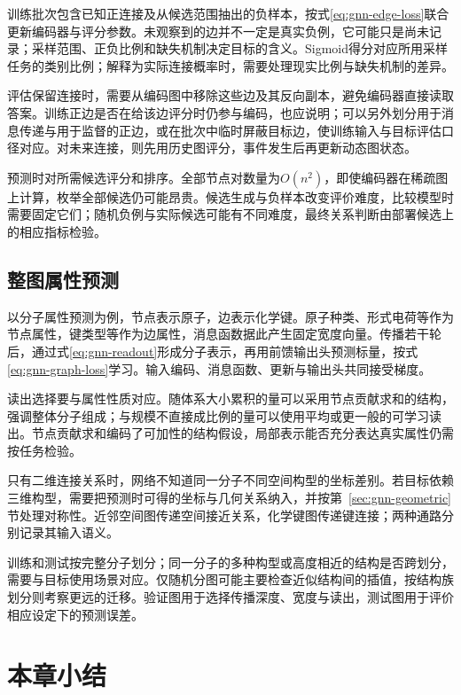 训练批次包含已知正连接及从候选范围抽出的负样本，按式\eqref{eq:gnn-edge-loss}联合更新编码器与评分参数。未观察到的边并不一定是真实负例，它可能只是尚未记录；采样范围、正负比例和缺失机制决定目标的含义。Sigmoid得分对应所用采样任务的类别比例；解释为实际连接概率时，需要处理现实比例与缺失机制的差异。

评估保留连接时，需要从编码图中移除这些边及其反向副本，避免编码器直接读取答案。训练正边是否在给该边评分时仍参与编码，也应说明；可以另外划分用于消息传递与用于监督的正边，或在批次中临时屏蔽目标边，使训练输入与目标评估口径对应。对未来连接，则先用历史图评分，事件发生后再更新动态图状态。

预测时对所需候选评分和排序。全部节点对数量为$O(n^2)$，即使编码器在稀疏图上计算，枚举全部候选仍可能昂贵。候选生成与负样本改变评价难度，比较模型时需要固定它们；随机负例与实际候选可能有不同难度，最终关系判断由部署候选上的相应指标检验。

\subsection{整图属性预测}
\label{sec:gnn-application-graph}

以分子属性预测为例，节点表示原子，边表示化学键。原子种类、形式电荷等作为节点属性，键类型等作为边属性，消息函数据此产生固定宽度向量。传播若干轮后，通过式\eqref{eq:gnn-readout}形成分子表示，再用前馈输出头预测标量，按式\eqref{eq:gnn-graph-loss}学习。输入编码、消息函数、更新与输出头共同接受梯度。

读出选择要与属性性质对应。随体系大小累积的量可以采用节点贡献求和的结构，强调整体分子组成；与规模不直接成比例的量可以使用平均或更一般的可学习读出。节点贡献求和编码了可加性的结构假设，局部表示能否充分表达真实属性仍需按任务检验。

只有二维连接关系时，网络不知道同一分子不同空间构型的坐标差别。若目标依赖三维构型，需要把预测时可得的坐标与几何关系纳入，并按第~\ref{sec:gnn-geometric}节处理对称性。近邻空间图传递空间接近关系，化学键图传递键连接；两种通路分别记录其输入语义。

训练和测试按完整分子划分；同一分子的多种构型或高度相近的结构是否跨划分，需要与目标使用场景对应。仅随机分图可能主要检查近似结构间的插值，按结构族划分则考察更远的迁移。验证图用于选择传播深度、宽度与读出，测试图用于评价相应设定下的预测误差。

\section{本章小结}
\label{sec:gnn-summary}

